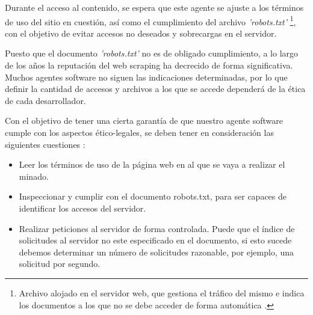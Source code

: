 Durante el acceso al contenido, se espera que este agente se ajuste a los términos de uso del sitio en
cuestión, así como el cumplimiento del archivo \emph{'robots.txt'} \footnote{Archivo alojado en el
servidor web, que gestiona el tráfico del mismo e indica los documentos a los que no se debe acceder de
forma automática \cite{robots-txt}.}, con el objetivo de evitar accesos no deseados y sobrecargas en el
servidor.

Puesto que el documento \emph{'robots.txt'} no es de obligado cumplimiento, a lo largo de los años la
reputación del web scraping ha decrecido de forma significativa. Muchos agentes software no siguen las
indicaciones determinadas, por lo que definir la cantidad de accesos y archivos a los que se accede
dependerá de la ética de cada desarrollador.

Con el objetivo de tener una cierta garantía de que nuestro agente software cumple con los aspectos
ético-legales, se deben tener en consideración las siguientes cuestiones \cite{legalidad-web-scraping}:

\begin{itemize}
\item Leer los términos de uso de la página web en al que se vaya a realizar el minado.

\item Inspeccionar y cumplir con el documento robots.txt, para ser capaces de identificar los accesos
del servidor.

\item Realizar peticiones al servidor de forma controlada. Puede que el índice de solicitudes al servidor
no este especificado en el documento, si esto sucede debemos determinar un número de solicitudes razonable,
por ejemplo, una solicitud por segundo.
\end{itemize}

















